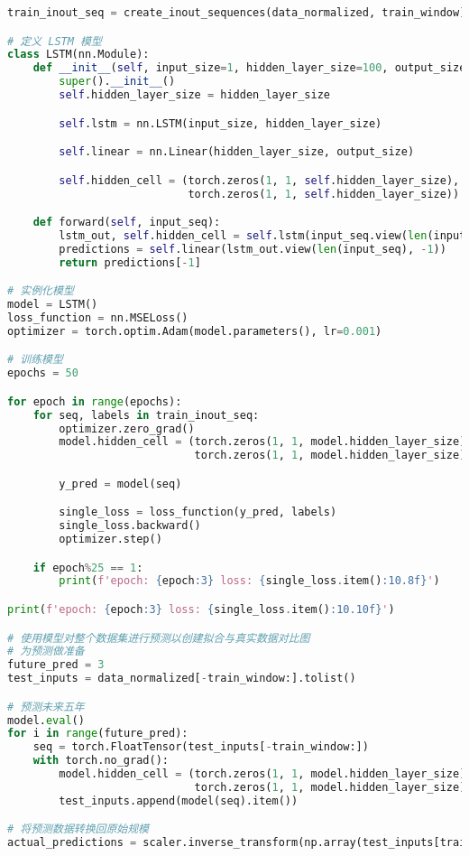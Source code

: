 \begin{lstlisting}[language=python,caption={中国机械总量}]
train_inout_seq = create_inout_sequences(data_normalized, train_window)

# 定义 LSTM 模型
class LSTM(nn.Module):
    def __init__(self, input_size=1, hidden_layer_size=100, output_size=1):
        super().__init__()
        self.hidden_layer_size = hidden_layer_size

        self.lstm = nn.LSTM(input_size, hidden_layer_size)

        self.linear = nn.Linear(hidden_layer_size, output_size)

        self.hidden_cell = (torch.zeros(1, 1, self.hidden_layer_size),
                            torch.zeros(1, 1, self.hidden_layer_size))

    def forward(self, input_seq):
        lstm_out, self.hidden_cell = self.lstm(input_seq.view(len(input_seq), 1, -1), self.hidden_cell)
        predictions = self.linear(lstm_out.view(len(input_seq), -1))
        return predictions[-1]

# 实例化模型
model = LSTM()
loss_function = nn.MSELoss()
optimizer = torch.optim.Adam(model.parameters(), lr=0.001)

# 训练模型
epochs = 50

for epoch in range(epochs):
    for seq, labels in train_inout_seq:
        optimizer.zero_grad()
        model.hidden_cell = (torch.zeros(1, 1, model.hidden_layer_size),
                             torch.zeros(1, 1, model.hidden_layer_size))

        y_pred = model(seq)

        single_loss = loss_function(y_pred, labels)
        single_loss.backward()
        optimizer.step()

    if epoch%25 == 1:
        print(f'epoch: {epoch:3} loss: {single_loss.item():10.8f}')

print(f'epoch: {epoch:3} loss: {single_loss.item():10.10f}')

# 使用模型对整个数据集进行预测以创建拟合与真实数据对比图
# 为预测做准备
future_pred = 3
test_inputs = data_normalized[-train_window:].tolist()

# 预测未来五年
model.eval()
for i in range(future_pred):
    seq = torch.FloatTensor(test_inputs[-train_window:])
    with torch.no_grad():
        model.hidden_cell = (torch.zeros(1, 1, model.hidden_layer_size),
                             torch.zeros(1, 1, model.hidden_layer_size))
        test_inputs.append(model(seq).item())

# 将预测数据转换回原始规模
actual_predictions = scaler.inverse_transform(np.array(test_inputs[train_window:] ).reshape(-1, 1))


\end{lstlisting}
